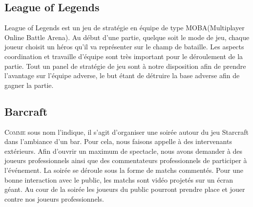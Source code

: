 
\subsection{League of Legends}%
\label{sub:league_of_legends}

League of Legends est un jeu de stratégie en équipe de type
MOBA(Multiplayer Online Battle Arena). Au début d'une partie, quelque
soit le mode de jeu, chaque joueur choisit un héros qu'il va représenter
sur le champ de bataille. Les aspects coordination et travaille d'équipe
sont très important pour le déroulement de la partie. Tout un panel de
stratégie de jeu sont à notre disposition afin de prendre l'avantage sur
l'équipe adverse, le but étant de détruire la base adverse afin de
gagner la partie.

\subsection{Barcraft}%
\label{sub:barcraft}

\lettrine{C}{omme} sous nom l'indique, il s'agit d'organiser une soirée
autour du jeu Starcraft dans l'ambiance d'un bar.	Pour cela, nous
faisons appelle à des intervenants extérieurs. Afin d'ouvrir un maximum
de spectacle, nous avons demander à des joueurs professionnels ainsi que
des commentateurs professionnels de participer à l'événement.  La soirée
se déroule sous la forme de matchs commentés. Pour une bonne interaction
avec le public, les matchs sont vidéo projetés sur un écran géant. Au
cour de la soirée les joueurs du public pourront prendre place et jouer
contre nos joueurs professionnels.

